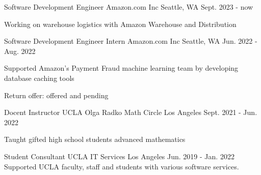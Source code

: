 

\begin{cventries}



\cventry
{Software Development Engineer} %
{Amazon.com Inc} %
{Seattle, WA} %
{Sept. 2023 - now} %
{
    \begin{cvitems}
        \item Working on warehouse logistics with Amazon Warehouse and Distribution
    \end{cvitems}
}

  \cventry
    {Software Development Engineer Intern} %
    {Amazon.com Inc} %
    {Seattle, WA} %
    {Jun. 2022 - Aug. 2022} %
    {
        \begin{cvitems}
            \item Supported Amazon's Payment Fraud machine learning team by developing database caching tools
            \item Return offer: offered and pending
        \end{cvitems}
    }


  \cventry
    {Docent Instructor} %
    {UCLA Olga Radko Math Circle} %
    {Los Angeles} %
    {Sept. 2021 - Jun. 2022} %
    {
            \item Taught gifted high school students advanced mathematics
    }

  \cventry
    {Student Consultant} %
    {UCLA IT Services} %
    {Los Angeles} %
    {Jun. 2019 - Jan. 2022} %
    {
        Supported UCLA faculty, staff and students with various software services.
    }
    


\end{cventries}

